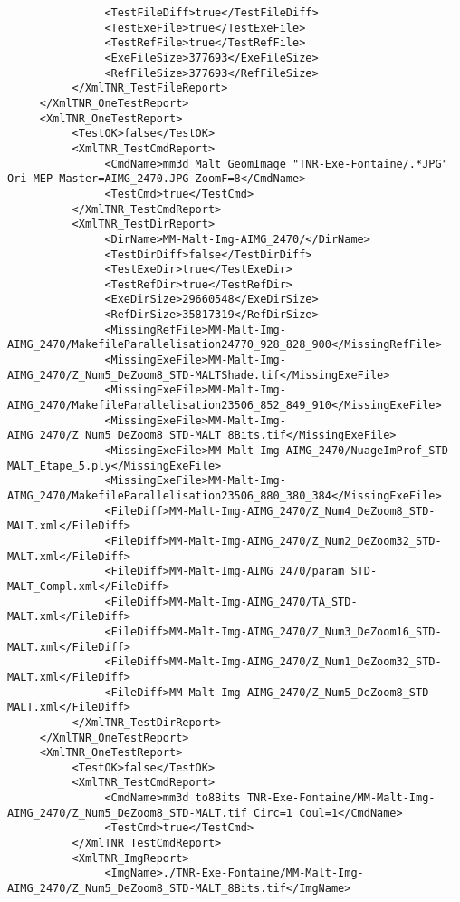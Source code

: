 \documentclass[a4paper]{book}
\begin{document}
\begin{lstlisting}
               <TestFileDiff>true</TestFileDiff>
               <TestExeFile>true</TestExeFile>
               <TestRefFile>true</TestRefFile>
               <ExeFileSize>377693</ExeFileSize>
               <RefFileSize>377693</RefFileSize>
          </XmlTNR_TestFileReport>
     </XmlTNR_OneTestReport>
     <XmlTNR_OneTestReport>
          <TestOK>false</TestOK>
          <XmlTNR_TestCmdReport>
               <CmdName>mm3d Malt GeomImage "TNR-Exe-Fontaine/.*JPG" Ori-MEP Master=AIMG_2470.JPG ZoomF=8</CmdName>
               <TestCmd>true</TestCmd>
          </XmlTNR_TestCmdReport>
          <XmlTNR_TestDirReport>
               <DirName>MM-Malt-Img-AIMG_2470/</DirName>
               <TestDirDiff>false</TestDirDiff>
               <TestExeDir>true</TestExeDir>
               <TestRefDir>true</TestRefDir>
               <ExeDirSize>29660548</ExeDirSize>
               <RefDirSize>35817319</RefDirSize>
               <MissingRefFile>MM-Malt-Img-AIMG_2470/MakefileParallelisation24770_928_828_900</MissingRefFile>
               <MissingExeFile>MM-Malt-Img-AIMG_2470/Z_Num5_DeZoom8_STD-MALTShade.tif</MissingExeFile>
               <MissingExeFile>MM-Malt-Img-AIMG_2470/MakefileParallelisation23506_852_849_910</MissingExeFile>
               <MissingExeFile>MM-Malt-Img-AIMG_2470/Z_Num5_DeZoom8_STD-MALT_8Bits.tif</MissingExeFile>
               <MissingExeFile>MM-Malt-Img-AIMG_2470/NuageImProf_STD-MALT_Etape_5.ply</MissingExeFile>
               <MissingExeFile>MM-Malt-Img-AIMG_2470/MakefileParallelisation23506_880_380_384</MissingExeFile>
               <FileDiff>MM-Malt-Img-AIMG_2470/Z_Num4_DeZoom8_STD-MALT.xml</FileDiff>
               <FileDiff>MM-Malt-Img-AIMG_2470/Z_Num2_DeZoom32_STD-MALT.xml</FileDiff>
               <FileDiff>MM-Malt-Img-AIMG_2470/param_STD-MALT_Compl.xml</FileDiff>
               <FileDiff>MM-Malt-Img-AIMG_2470/TA_STD-MALT.xml</FileDiff>
               <FileDiff>MM-Malt-Img-AIMG_2470/Z_Num3_DeZoom16_STD-MALT.xml</FileDiff>
               <FileDiff>MM-Malt-Img-AIMG_2470/Z_Num1_DeZoom32_STD-MALT.xml</FileDiff>
               <FileDiff>MM-Malt-Img-AIMG_2470/Z_Num5_DeZoom8_STD-MALT.xml</FileDiff>
          </XmlTNR_TestDirReport>
     </XmlTNR_OneTestReport>
     <XmlTNR_OneTestReport>
          <TestOK>false</TestOK>
          <XmlTNR_TestCmdReport>
               <CmdName>mm3d to8Bits TNR-Exe-Fontaine/MM-Malt-Img-AIMG_2470/Z_Num5_DeZoom8_STD-MALT.tif Circ=1 Coul=1</CmdName>
               <TestCmd>true</TestCmd>
          </XmlTNR_TestCmdReport>
          <XmlTNR_ImgReport>
               <ImgName>./TNR-Exe-Fontaine/MM-Malt-Img-AIMG_2470/Z_Num5_DeZoom8_STD-MALT_8Bits.tif</ImgName>

\end{lstlisting}
\end{document}
